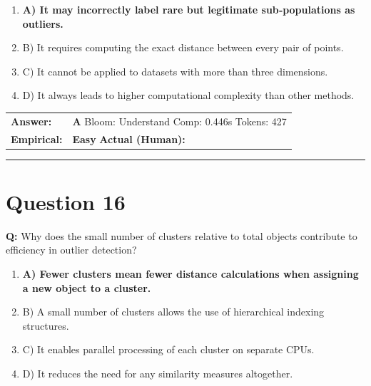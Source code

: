 \documentclass[9pt]{article}
\begin{document}
\begin{enumerate}[label=\textbf{\alph{*})}, nosep]
    \item \textbf{A) It may incorrectly label rare but legitimate sub‑populations as outliers.} %
    \item B) It requires computing the exact distance between every pair of points.
    \item C) It cannot be applied to datasets with more than three dimensions.
    \item D) It always leads to higher computational complexity than other methods.

\end{enumerate}

\begin{tabular}{@{}l p{10.5cm}@{}}
\textbf{Answer:} & \textbf{A} \hspace{1em} Bloom: Understand \hspace{1em} Comp: 0.446s \hspace{1em} Tokens: 427 \\
\textbf{Empirical:} & \textbf{Easy} \hspace{1em} \textbf{Actual (Human):} \underline{\hspace{5cm}}
\end{tabular}

\vspace{0.2cm}
\rule{\textwidth}{0.4pt}
\vspace{0.2cm}


\section*{Question 16}

\textbf{Q:} Why does the small number of clusters relative to total objects contribute to efficiency in outlier detection?

\begin{enumerate}[label=\textbf{\alph{*})}, nosep]
    \item \textbf{A) Fewer clusters mean fewer distance calculations when assigning a new object to a cluster.} %
    \item B) A small number of clusters allows the use of hierarchical indexing structures.
    \item C) It enables parallel processing of each cluster on separate CPUs.
    \item D) It reduces the need for any similarity measures altogether.

\end{enumerate}
\end{document}
